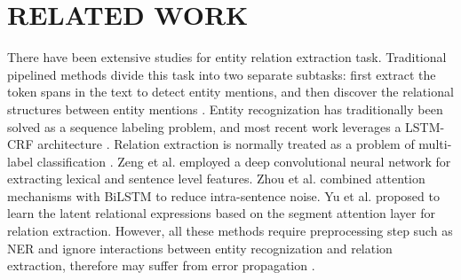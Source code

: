 \documentclass{ecai}
\begin{document}
\section{RELATED WORK}
There have been extensive studies for entity relation extraction task. 
Traditional pipelined methods divide this task into two separate subtasks: first extract the token spans in the text to detect entity mentions, and then discover the relational structures between entity mentions \cite{zelenko2003kernel}.
Entity recognization has traditionally been solved as a sequence labeling problem, and most recent work leverages a LSTM-CRF architecture \cite{lample2016neural,mengge2019porous,zhang2018chinese}. 
Relation extraction is normally treated as a problem of multi-label classification \cite{zhang2020distilling}. 
Zeng et al. \cite{zeng2014relation} employed a deep convolutional neural network for extracting lexical and sentence level features. 
Zhou et al. \cite{zhou2016attention} combined attention mechanisms with BiLSTM to reduce intra-sentence noise.
Yu et al. \cite{yu2019beyond} proposed to learn the latent relational expressions based on the segment attention layer for relation extraction.
However, all these methods require preprocessing step such as NER and ignore interactions between entity recognization and relation extraction, therefore may suffer from error propagation \cite{bekoulis2018joint, dai2019joint,ren2017cotype,sun2018extracting}. 
\end{document}
